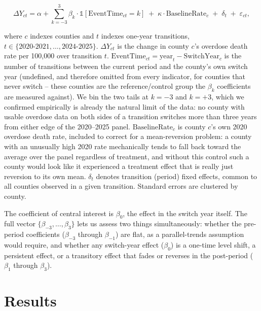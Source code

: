 \documentclass{article}
\begin{document}
\begin{equation}
\Delta Y_{ct} = \alpha + \sum_{k=-3}^{3} \beta_k \cdot \mathbb{1}[\text{EventTime}_{ct} = k] \;+\; \kappa \cdot
\text{BaselineRate}_c \;+\; \delta_t \;+\; \varepsilon_{ct},
\label{eq:eventstudy}
\end{equation}

\noindent where $c$ indexes counties and $t$ indexes one-year transitions, $t \in \{2020\text{-}2021, \ldots,
2024\text{-}2025\}$. $\Delta Y_{ct}$ is the change in county $c$'s overdose death rate per 100{,}000 over transition
$t$. $\text{EventTime}_{ct} = \text{year}_t - \text{SwitchYear}_c$ is the number of transitions between the current
period and the county's own switch year (undefined, and therefore omitted from every indicator, for counties that
never switch -- these counties are the reference/control group the $\beta_k$ coefficients are measured against). We
bin the two tails at $k=-3$ and $k=+3$, which we confirmed empirically is already the natural limit of the data: no
county with usable overdose data on both sides of a transition switches more than three years from either edge of
the 2020--2025 panel. $\text{BaselineRate}_c$ is county $c$'s own 2020 overdose death rate, included to correct for
a mean-reversion problem: a county with an unusually high 2020 rate mechanically tends to fall back toward the
average over the panel regardless of treatment, and without this control such a county would look like it
experienced a treatment effect that is really just reversion to its own mean. $\delta_t$ denotes transition
(period) fixed effects, common to all counties observed in a given transition. Standard errors are clustered by
county.

The coefficient of central interest is $\beta_0$, the effect in the switch year itself. The full vector
$\{\beta_{-3}, \ldots, \beta_{3}\}$ lets us assess two things simultaneously: whether the pre-period coefficients
($\beta_{-3}$ through $\beta_{-1}$) are flat, as a parallel-trends assumption would require, and whether any
switch-year effect ($\beta_0$) is a one-time level shift, a persistent effect, or a transitory effect that fades
or reverses in the post-period ($\beta_1$ through $\beta_3$).

\section{Results}
\end{document}
